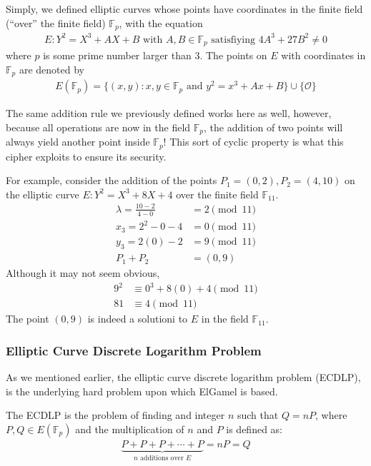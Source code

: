 \documentclass[12pt, a4paper, draft]{report}
\begin{document}
Simply, we defined elliptic curves whose points have coordinates
in the finite field (``over'' the finite field) $\mathds{F}_p$, with
the equation
\begin{align*}
    E:Y^2 = X^3 + AX + B \text{ with } A, B \in \mathds{F}_p \text{ satisfiying }
    4A^3 + 27B^2 \neq 0
\end{align*}
where $p$ is some prime number larger than 3. The points on $E$ with
coordinates in $\mathds{F}_p$ are denoted by
\begin{align*}
    E(\mathds{F}_p) = \{ (x, y): x, y \in \mathds{F}_p \text{ and } y^2 = x^3 + Ax + B \} \cup \{ \mathcal{O} \}
\end{align*}

The same addition rule we previously defined works here as well, however,
because all operations are now in the field $\mathds{F}_p$, the addition
of two points will always yield another point inside $\mathds{F}_p$! This
sort of cyclic property is what this cipher exploits to ensure its
security.

For example, consider the addition of the points $P_1 = (0, 2), P_2 = (4, 10)$ on the
elliptic curve $E:Y^2 = X^3 + 8X + 4$ over the finite field $\mathds{F}_11$.
\begin{align*}
    \lambda = \frac{10 - 2}{4 - 0} &= 2 \pmod{11}\\
    x_3 = 2^2 - 0 - 4 &= 0 \pmod{11}\\
    y_3 = 2(0) - 2 &= 9 \pmod{11}\\
    P_1 + P_2 &= (0, 9)
\end{align*}
Although it may not seem obvious,
\begin{align*}
    9^2 &\equiv 0^3 + 8(0) + 4 \pmod{11}\\
    81 &\equiv 4 \pmod{11}
\end{align*}
The point $(0, 9)$ is indeed a solutioni to $E$ in the field $\mathds{F}_11$.

\subsubsection{Elliptic Curve Discrete Logarithm Problem}

As we mentioned earlier, the elliptic curve discrete logarithm problem (ECDLP),
is the underlying hard problem upon which ElGamel is based.

The ECDLP is the problem of finding and integer $n$ such that
$Q = nP$, where $P, Q \in E(\mathds{F}_p)$ and the multiplication of $n$ and
$P$ is defined as:
\begin{align*}
    \underbrace{P + P + P + \cdots + P}_{\text{$n$ additions over $E$}} = nP = Q
\end{align*}
\end{document}
